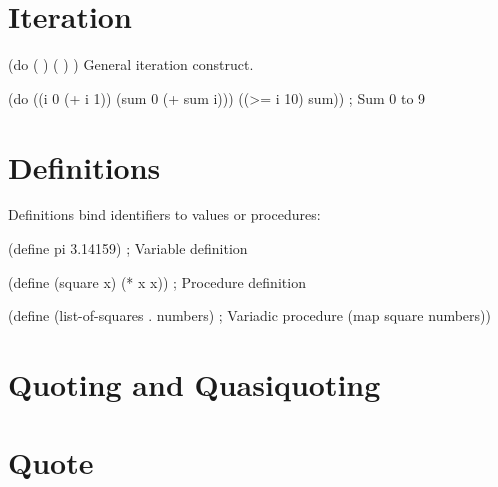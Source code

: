 \section{Iteration}
\label{sec:iteration}

\begin{syntaxspec}{(do (  ) ( ) )}
General iteration construct.
\begin{lambdustcode}
(do ((i 0 (+ i 1))
     (sum 0 (+ sum i)))
    ((>= i 10) sum))    ; Sum 0 to 9
\end{lambdustcode}
\end{syntaxspec}

\section{Definitions}
\label{sec:definitions}


Definitions bind identifiers to values or procedures:

\begin{grammar}
\end{grammar}

\begin{example}[Definitions]
\begin{lambdustcode}
(define pi 3.14159)                    ; Variable definition

(define (square x) (* x x))            ; Procedure definition

(define (list-of-squares . numbers)    ; Variadic procedure
  (map square numbers))
\end{lambdustcode}
\end{example}

\section{Quoting and Quasiquoting}
\label{sec:quoting}


\section{Quote}
\label{sec:quote}

